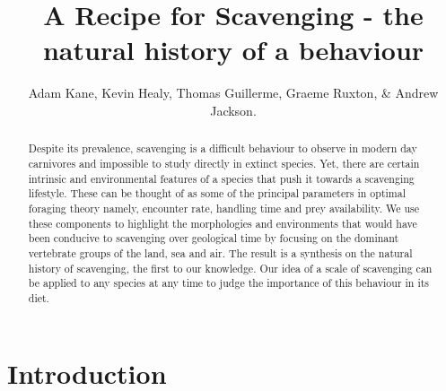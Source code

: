 \documentclass[a4paper,12pt]{article}
\title{A Recipe for Scavenging - the natural history of a behaviour}
\author{Adam Kane, Kevin Healy, Thomas Guillerme, Graeme Ruxton, \& Andrew Jackson.}
\begin{document}
 \maketitle


\begin{abstract} 
Despite its prevalence, scavenging is a difficult behaviour to observe in modern day carnivores and impossible to study directly in extinct species. 
Yet, there are certain intrinsic and environmental features of a species that push it towards a scavenging lifestyle. 
These can be thought of as some of the principal parameters in optimal foraging theory namely, encounter rate, handling time and prey availability. 
We use these components to highlight the morphologies and environments that would have been conducive to scavenging over geological time by focusing on the dominant vertebrate groups of the land, sea and air. 
The result is a synthesis on the natural history of scavenging, the first to our knowledge. 
Our idea of a scale of scavenging can be applied to any species at any time to judge the importance of this behaviour in its diet. 
\end{abstract}

\newpage


\section*{Introduction}
\end{document}
